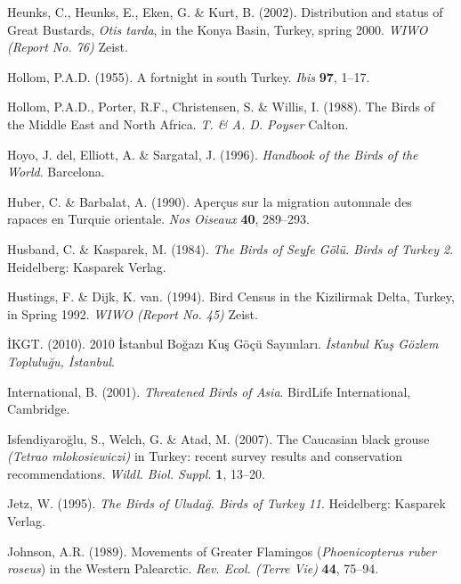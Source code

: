 \documentclass[
  a4paper,
  DIV=11,
  numbers=noendperiod]{scrreprt}
\newlength{\cslhangindent}
\newenvironment{CSLReferences}[2] %
 {\begin{list}{}{%
  \setlength{\itemindent}{0pt}
  \setlength{\leftmargin}{0pt}
  \setlength{\parsep}{0pt}
  \ifodd #1
   \setlength{\leftmargin}{\cslhangindent}
   \setlength{\itemindent}{-1\cslhangindent}
  \fi
  \setlength{\itemsep}{#2\baselineskip}}}
 {\end{list}}
\begin{document}
\begin{CSLReferences}{1}{1}
Heunks, C., Heunks, E., Eken, G. \& Kurt, B. (2002). {Distribution and
status of Great Bustards, \emph{Otis tarda}, in the Konya Basin, Turkey,
spring 2000}. \emph{WIWO (Report No. 76)} Zeist.

Hollom, P.A.D. (1955). {A fortnight in south Turkey}. \emph{Ibis}
\textbf{97}, 1--17.

Hollom, P.A.D., Porter, R.F., Christensen, S. \& Willis, I. (1988). {The
Birds of the Middle East and North Africa}. \emph{T. \& A. D. Poyser}
Calton.

Hoyo, J. del, Elliott, A. \& Sargatal, J. (1996). \emph{{Handbook of the
Birds of the World}}. Barcelona.

Huber, C. \& Barbalat, A. (1990). {Aperçus sur la migration automnale
des rapaces en Turquie orientale}. \emph{Nos Oiseaux} \textbf{40},
289--293.

Husband, C. \& Kasparek, M. (1984). \emph{{The Birds of Seyfe Gölü.
Birds of Turkey 2}}. Heidelberg: Kasparek Verlag.

Hustings, F. \& Dijk, K. van. (1994). {Bird Census in the Kizilirmak
Delta, Turkey, in Spring 1992}. \emph{WIWO (Report No. 45)} Zeist.

İKGT. (2010). {2010 İstanbul Boğazı Kuş Göçü Sayımları}. \emph{İstanbul
Kuş Gözlem Topluluğu, İstanbul}.

International, B. (2001). \emph{{Threatened Birds of Asia}}. BirdLife
International, Cambridge.

Isfendiyaroğlu, S., Welch, G. \& Atad, M. (2007). {The Caucasian black
grouse \emph{(Tetrao mlokosiewiczi)} in Turkey: recent survey results
and conservation recommendations}. \emph{Wildl. Biol. Suppl.}
\textbf{1}, 13--20.

Jetz, W. (1995). \emph{{The Birds of Uludağ. Birds of Turkey 11}}.
Heidelberg: Kasparek Verlag.

Johnson, A.R. (1989). {Movements of Greater Flamingos
(\emph{Phoenicopterus ruber roseus}) in the Western Palearctic}.
\emph{Rev. Ecol. (Terre Vie)} \textbf{44}, 75--94.


\end{CSLReferences}
\end{document}
